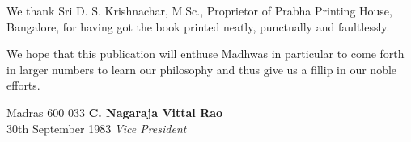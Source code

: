We thank Sri D. S. Krishnachar, M.Sc., Proprietor of Prabha Printing House, Bangalore, for having got the book printed neatly, punctually and faultlessly.

We hope that this publication will enthuse Madhwas in particular to come forth in larger numbers to learn our philosophy and thus give us a fillip in our noble efforts.

\vskip 1cm

\noindent
Madras 600 033 \hfill \textbf{C. Nagaraja Vittal Rao}\\ 30th September 1983 \hfill \textit{Vice President}

